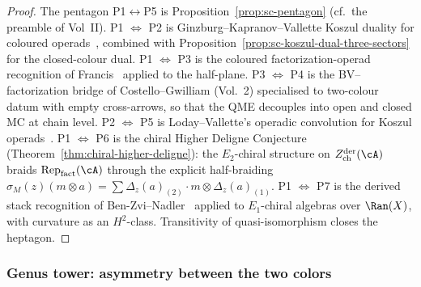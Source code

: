 \begin{proof}
The pentagon P1$\leftrightarrow$P5 is
Proposition~\ref{prop:sc-pentagon} (cf.\ the preamble of Vol~II). P1
$\Leftrightarrow$ P2 is Ginzburg--Kapranov--Vallette Koszul duality
for coloured operads~\cite{GK94,Val07}, combined with
Proposition~\ref{prop:sc-koszul-dual-three-sectors} for the closed-colour
dual. P1 $\Leftrightarrow$ P3 is the coloured factorization-operad
recognition of Francis~\cite{Fra13} applied to the half-plane. P3
$\Leftrightarrow$ P4 is the BV--factorization bridge of
Costello--Gwilliam (Vol.~2) specialised to two-colour datum with
empty cross-arrows, so that the QME decouples into open and closed
MC at chain level. P2 $\Leftrightarrow$ P5 is Loday--Vallette's
operadic convolution for Koszul operads~\cite{LV12}. P1
$\Leftrightarrow$ P6 is the chiral Higher Deligne Conjecture
(Theorem~\ref{thm:chiral-higher-deligne}): the $E_2$-chiral structure
on $Z^{\mathrm{der}}_{\mathrm{ch}}(\cA)$ braids $\mathrm{Rep}_{\mathrm{fact}}(\cA)$
through the explicit half-braiding
$\sigma_M(z)(m \otimes a) = \sum \Delta_z(a)_{(2)} \cdot m \otimes
\Delta_z(a)_{(1)}$. P1 $\Leftrightarrow$ P7 is the
derived stack recognition of Ben-Zvi--Nadler~\cite{BZN} applied to
$E_1$-chiral algebras over $\Ran(X)$, with curvature as an
$H^2$-class. Transitivity of quasi-isomorphism closes the heptagon.
\end{proof}

\subsubsection*{Genus tower: asymmetry between the two colors}

